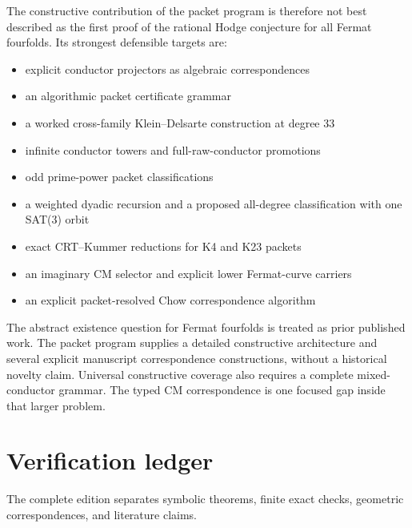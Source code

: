 The constructive contribution of the packet program is therefore not best described as the first proof of the rational Hodge conjecture for all Fermat fourfolds. Its strongest defensible targets are:
\begin{itemize}
\item explicit conductor projectors as algebraic correspondences
\item an algorithmic packet certificate grammar
\item a worked cross-family Klein--Delsarte construction at degree 33
\item infinite conductor towers and full-raw-conductor promotions
\item odd prime-power packet classifications
\item a weighted dyadic recursion and a proposed all-degree classification with one SAT(3) orbit
\item exact CRT--Kummer reductions for K4 and K23 packets
\item an imaginary CM selector and explicit lower Fermat-curve carriers
\item an explicit packet-resolved Chow correspondence algorithm
\end{itemize}

\begin{resultbox}
The abstract existence question for Fermat fourfolds is treated as prior published work. The packet program supplies a detailed constructive architecture and several explicit manuscript correspondence constructions, without a historical novelty claim. Universal constructive coverage also requires a complete mixed-conductor grammar. The typed CM correspondence is one focused gap inside that larger problem.
\end{resultbox}


\chapter{Verification ledger}
The complete edition separates symbolic theorems, finite exact checks, geometric correspondences, and literature claims.

